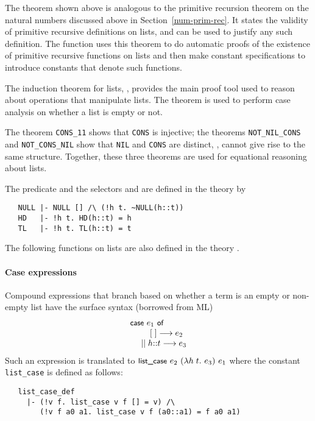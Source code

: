 The theorem  shown above is analogous to the primitive
recursion theorem
%
%
on the natural numbers discussed above in Section~\ref{num-prim-rec}.
It states the validity of primitive recursive definitions on lists,
and can be used to justify any such definition.  The \ML{} function
 uses this theorem to do
automatic
%
%
proofs of the existence of primitive recursive functions on lists and
then make constant specifications to introduce constants that denote
such functions.

The induction theorem for lists, , provides the main
proof tool used to reason about operations that manipulate lists. The
theorem  is used to perform case analysis on whether a
list is empty or not.

The theorem {\small\verb+CONS_11+} shows that {\small\verb+CONS+} is injective;
the theorems {\small\verb+NOT_NIL_CONS+} and {\small\verb+NOT_CONS_NIL+} show that
{\small\verb+NIL+} and {\small\verb+CONS+} are distinct, \ie,
cannot give rise to the same structure. Together, these three theorems
are used for equational reasoning about lists.

The predicate  and the selectors
%
%
 and  are defined in the theory  by
%
\begin{hol}
{\small
\begin{verbatim}
   NULL |- NULL [] /\ (!h t. ~NULL(h::t))
   HD   |- !h t. HD(h::t) = h
   TL   |- !h t. TL(h::t) = t
\end{verbatim}
}
\end{hol}

\noindent The following functions on lists are also defined in the theory .
%
%
\paragraph{Case expressions}

Compound \HOL{} expressions that branch based on
whether a term is an empty or non-empty list have the
surface syntax (borrowed from ML)
\[
\begin{array}{l}
\mbox{\small{\textbf{\sf{case}}}}\ e_1 \ \mbox{\small{\textbf{\sf{of}}}} \\
{~~~~~~~}  \mathbf{[} \;\mathbf{]} \longrightarrow e_2 \\
{~~~}  \mid\mid {h}\mathbf{:}\mathbf{:}{t} \longrightarrow e_3
\end{array}
\]
%
Such an expression is translated to
$\konst{list\_case}\ e_2\ (\lambda h\; t.\ e_3)\ e_1$ where the constant
{\small\verb+list_case+} is defined as follows:
{\small
\begin{verbatim}
   list_case_def
     |- (!v f. list_case v f [] = v) /\
        (!v f a0 a1. list_case v f (a0::a1) = f a0 a1)
\end{verbatim}
}

